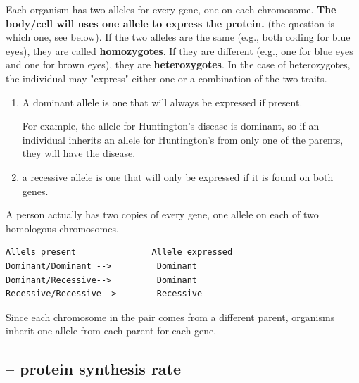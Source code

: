 Each organism has two alleles for every gene, one on each chromosome.
{\bf The body/cell will uses one allele to express the protein.} (the question
is which one, see below). If the two alleles are the same (e.g., both coding for
blue eyes), they are called {\bf homozygotes}. If they are different (e.g., one for blue eyes and one
for brown eyes), they are {\bf heterozygotes}.  In the case of heterozygotes,
the individual may "express" either one or a combination of the two traits.
\begin{enumerate}
  \item A dominant allele is one that will always be expressed if present. 
  
  For example, the allele for Huntington's disease is dominant, so if an
  individual inherits an allele for Huntington's from only one of the parents,
  they will have the disease. 
  
  \item a recessive allele is one that will only be expressed if it is found on
  both genes.
\end{enumerate}
A person actually has two copies of every gene, one allele on each of two
homologous chromosomes. 
\begin{verbatim}
Allels present               Allele expressed
Dominant/Dominant -->         Dominant
Dominant/Recessive-->         Dominant
Recessive/Recessive-->        Recessive
\end{verbatim}

Since each chromosome in the pair comes from a different parent, organisms
inherit one allele from each parent for each gene. 

\subsection{-- protein synthesis rate}


